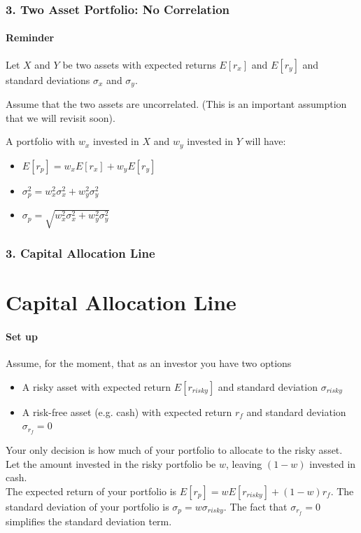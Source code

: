 \documentclass{beamer}
\begin{document}
\begin{foundframe}
    \frametitle{3. Two Asset Portfolio: No Correlation}
    \framesubtitle{Reminder }

    Let $X$ and $Y$ be two assets with expected returns $E[r_x]$ and $E[r_y]$ and standard deviations $\sigma_x$ and $\sigma_y$.  
    \vspace{1em}
    
    Assume that the two assets are uncorrelated.   (This is an important assumption that we will revisit soon).
    \vspace{1em}

    A portfolio with $w_x$ invested in $X$ and $w_y$ invested in $Y$ will have:
    \begin{itemize}
        \item $E[r_p] = w_x E[r_x] + w_y E[r_y]$
        \item $\sigma_p^2 = w_x^2 \sigma_x^2 + w_y^2 \sigma_y^2$
        \item $\sigma_p = \sqrt{ w_x^2 \sigma_x^2 + w_y^2 \sigma_y^2}$
    \end{itemize}

    
\end{foundframe}

\begin{frame}[t]
    \frametitle{3. Capital Allocation Line}
    \section{Capital Allocation Line}
    \framesubtitle{Set up}

    Assume, for the moment, that as an investor you have two options
    \begin{itemize}
        \item A risky asset with expected return $E[r_{risky}]$ and standard deviation $\sigma_{risky}$
        \item A risk-free asset (e.g. cash) with expected return $r_f$ and standard deviation $\sigma_{r_f} = 0$
    \end{itemize}
    Your only decision is how much of your portfolio to allocate to the risky asset.   Let the amount invested in the risky portfolio be $w$, leaving $(1-w)$ invested in cash.\\
    \vspace{1em}
    The expected return of your portfolio is $E[r_p] = wE[r_{risky}] + (1-w)r_f$.   The standard deviation of your portfolio is $\sigma_p = w\sigma_{risky}$.   The fact that $\sigma_{r_f} = 0$ simplifies the standard deviation term.
    \vspace{1em}

\end{frame}
\end{document}
